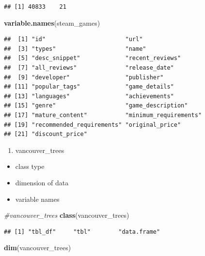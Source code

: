 \documentclass[
]{article}
\newenvironment{Shaded}{\begin{snugshade}}{\end{snugshade}}
\newcommand{\CommentTok}[1]{\textcolor[rgb]{0.56,0.35,0.01}{\textit{#1}}}
\newcommand{\KeywordTok}[1]{\textcolor[rgb]{0.13,0.29,0.53}{\textbf{#1}}}
\newcommand{\NormalTok}[1]{#1}
\providecommand{\tightlist}{%
  \setlength{\itemsep}{0pt}\setlength{\parskip}{0pt}}
\begin{document}
\begin{verbatim}
## [1] 40833    21
\end{verbatim}

\begin{Shaded}
\begin{Highlighting}[]
\KeywordTok{variable.names}\NormalTok{(steam\_games)}
\end{Highlighting}
\end{Shaded}

\begin{verbatim}
##  [1] "id"                       "url"                     
##  [3] "types"                    "name"                    
##  [5] "desc_snippet"             "recent_reviews"          
##  [7] "all_reviews"              "release_date"            
##  [9] "developer"                "publisher"               
## [11] "popular_tags"             "game_details"            
## [13] "languages"                "achievements"            
## [15] "genre"                    "game_description"        
## [17] "mature_content"           "minimum_requirements"    
## [19] "recommended_requirements" "original_price"          
## [21] "discount_price"
\end{verbatim}

\begin{enumerate}
\def\labelenumi{\arabic{enumi}.}
\setcounter{enumi}{3}
\tightlist
\item
  vancouver\_trees
\end{enumerate}

\begin{itemize}
\tightlist
\item
  class type
\item
  dimension of data
\item
  variable names
\end{itemize}

\begin{Shaded}
\begin{Highlighting}[]
\CommentTok{\#vancouver\_trees}
\KeywordTok{class}\NormalTok{(vancouver\_trees)}
\end{Highlighting}
\end{Shaded}

\begin{verbatim}
## [1] "tbl_df"     "tbl"        "data.frame"
\end{verbatim}

\begin{Shaded}
\begin{Highlighting}[]
\KeywordTok{dim}\NormalTok{(vancouver\_trees)}
\end{Highlighting}
\end{Shaded}
\end{document}
